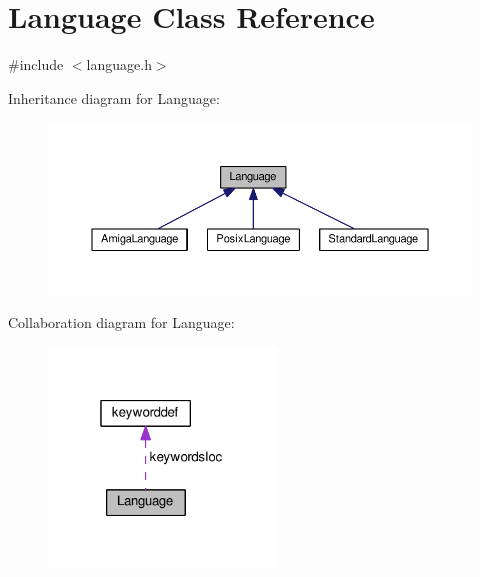 \hypertarget{classLanguage}{}\section{Language Class Reference}
\label{classLanguage}


{\ttfamily \#include $<$language.\+h$>$}



Inheritance diagram for Language\+:\nopagebreak
\begin{figure}[H]
\begin{center}
\leavevmode
\includegraphics[width=350pt]{classLanguage__inherit__graph}
\end{center}
\end{figure}


Collaboration diagram for Language\+:\nopagebreak
\begin{figure}[H]
\begin{center}
\leavevmode
\includegraphics[width=172pt]{classLanguage__coll__graph}
\end{center}
\end{figure}
